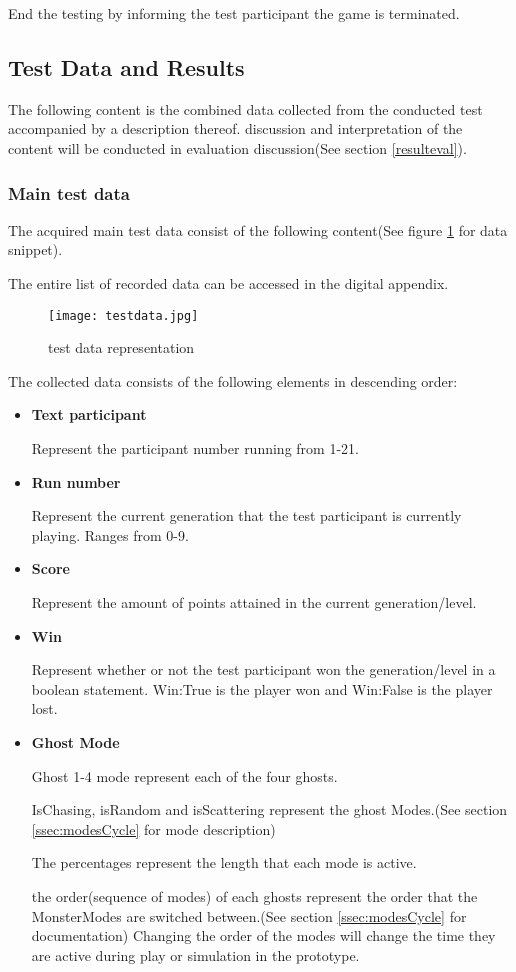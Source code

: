 End the testing by informing the test participant the game is terminated.



\newpage
\subsection{Test Data and Results}
The following content is the combined data collected from the conducted test accompanied by a description thereof. discussion and interpretation of the content will be conducted in evaluation discussion(See section \ref{resulteval}).

\subsubsection{Main test data}
The acquired main test data consist of the following content(See figure \ref{fig:testdata} for data snippet).

The entire list of recorded data can be accessed in the digital appendix.

\begin{figure}[!htbp]
\centering
\texttt{[image: testdata.jpg]}
\caption{test data representation}
\label{fig:testdata}
\end{figure}


\newpage

The collected data consists of the following elements in descending order:

\begin{itemize}
\item  \textbf{Text participant}

Represent the participant number running from 1-21.
\item  \textbf{Run number}

Represent the current generation that the test participant is currently playing. Ranges from 0-9.
\item  \textbf{Score}

Represent the amount of points attained in the current generation/level.
\item  \textbf{Win}

Represent whether or not the test participant won the generation/level in a boolean statement. Win:True is the player won and Win:False is the player lost.
\item  \textbf{Ghost Mode}

Ghost 1-4 mode represent each of the four ghosts.


IsChasing, isRandom and isScattering represent the ghost Modes.(See section \ref{ssec:modesCycle} for mode description)

The percentages represent the length that each mode is active.

the order(sequence of modes) of each ghosts represent the order that the MonsterModes are switched between.(See section \ref{ssec:modesCycle} for documentation) Changing the order of the modes will change the time they are active during play or simulation in the prototype.
\end{itemize}

